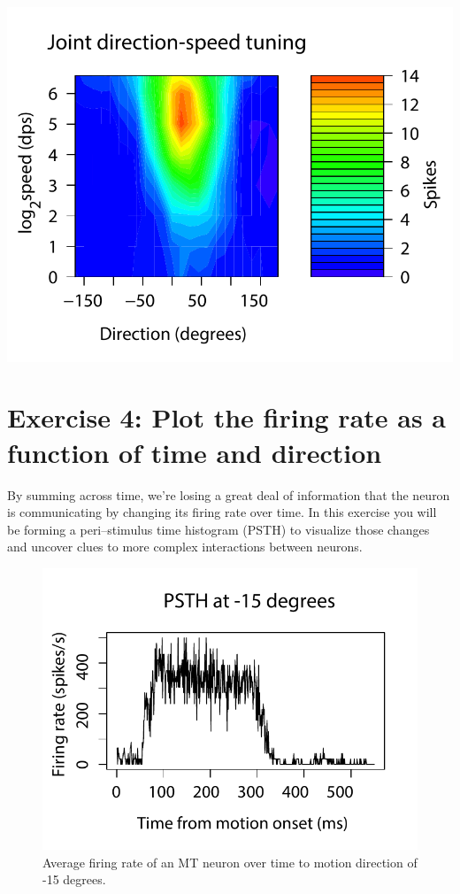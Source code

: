 \documentclass[
letterpaper, %
11pt, %
 oneside, 
onecolumn, %
]{memoir}
\numberwithin{Exercise}{chapter}
\begin{document}
\includegraphics[scale=0.7]{2dtunecurve} 


\section{Exercise 4:  Plot the firing rate as a function of time and direction}   

By summing across time, we're losing a great deal of information that the neuron is communicating by changing its firing rate over time. In this exercise you will be forming a peri--stimulus time histogram (PSTH) to visualize those changes and uncover clues to more complex interactions between neurons. 

\begin{figure}
\centering
\includegraphics[scale=0.7]{psth1d}
\caption{Average firing rate of an MT neuron over time to motion direction of -15 degrees.}
\end{figure}
\end{document}

